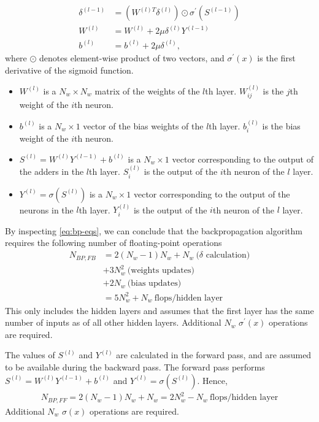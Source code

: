 \documentclass[a4paper]{article}
\begin{document}
\begin{align} \label{eq:bp-eqs}
\delta^{(l-1)} &= (W^{(l)T}\delta^{(l)})\odot \sigma^\prime (S^{(l-1)}) \\
W^{(l)} &= W^{(l)} + 2\mu\delta^{(l)}Y^{(l-1)} \\
b^{(l)} &= b^{(l)} +  2\mu\delta^{(l)},
\end{align}
where $\odot$ denotes element-wise product of two vectors, and $\sigma^\prime(x)$ is the first derivative of the sigmoid function.
\begin{itemize}
	\item $W^{(l)}$ is a $N_w \times N_w$ matrix of the weights of the $l$th layer. $W_{ij}^{(l)}$ is the $j$th weight of the $i$th neuron. \\
	\item $b^{(l)}$ is a $N_w \times 1$ vector of the bias weights of the $l$th layer. $b_i^{(l)}$ is the bias weight of the $i$th neuron. \\
	\item $S^{(l)} = W^{(l)}Y^{(l-1)} + b^{(l)}$ is a $N_w \times 1$ vector corresponding to the output of the adders in the $l$th layer. $S_i^{(l)}$ is the output of the $i$th neuron of the $l$ layer.
	\item $Y^{(l)} = \sigma(S^{(l)})$ is a $N_w \times 1$ vector corresponding to the output of the neurons in the $l$th layer. $Y_i^{(l)}$ is the output of the $i$th neuron of the $l$ layer.
\end{itemize}

By inspecting \eqref{eq:bp-eqs}, we can conclude that the backpropagation algorithm requires the following number of floating-point operations
\begin{align} \nonumber
N_{BP, FB} &= 2(N_w - 1)N_w + N_w~\text{($\delta$ calculation)} \\ \nonumber
& + 3N_w^2~\text{(weights updates)}\\  \nonumber
& + 2N_w~\text{(bias updates)} \\
& = 5N_w^2 + N_w~\text{flops/hidden layer}
\end{align}
This only includes the hidden layers and assumes that the first layer has the same number of inputs as of all other hidden layers. Additional $N_w$ $\sigma^\prime(x)$ operations are required. 

The values of $S^{(l)}$ and $Y^{(l)}$ are calculated in the forward pass, and are assumed to be available during the backward pass. The forward pass performs $S^{(l)} = W^{(l)}Y^{(l-1)} + b^{(l)}$ and $Y^{(l)} = \sigma(S^{(l)})$. Hence,
\begin{align}
N_{BP, FF} = 2(N_w-1)N_w + N_w = 2N_w^2 - N_w ~\text{flops/hidden layer}
\end{align}
Additional $N_w$ $\sigma(x)$ operations are required. 
\end{document}
